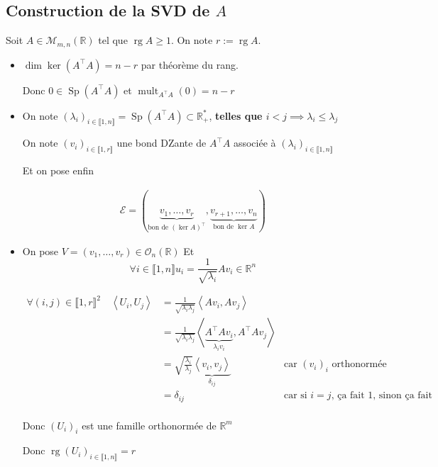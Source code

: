 \documentclass{article}
\newcommand{\mult}{\operatorname{mult}}
\newcommand{\Sp}{\operatorname{Sp}}
\newcommand{\rg}{\operatorname{rg}}
\newcommand{\dim}{\operatorname{dim}}
\newcommand{\cM}{\mathcal{M}}
\newcommand{\cO}{\mathcal{O}}
\newcommand{\cE}{\mathcal{E}}
\newcommand{\R}{\mathbb{R}}
\begin{document}
\subsection{Construction de la SVD de $A$}

Soit $A \in \cM_{m,n}(\R)$ tel que $\rg A \ge 1$. On note $r := \rg A$.

\begin{itemize}
	\item $\dim \ker (A^\top A) = n - r$ par théorème du rang. 

		Donc $0 \in \Sp(A^\top A)$ et $\mult_{A^\top A}(0) = n -r$
	\item On note $(\lambda_i)_{i\in \llbracket 1, n \rrbracket} = \Sp(A^\top A) \subset \R_+^\ast$, {\bf telles que $i < j \implies \lambda_i \le  \lambda_j$}

		On note $(v_i)_{i\in \llbracket 1, r\rrbracket}$ une bond DZante de $A^\top A$ associée à $(\lambda_i)_{i\in \llbracket 1, n \rrbracket}$

		Et on pose enfin

		\begin{align*}
		\cE = \left(\underbrace{v_1, \ldots, v_r}_{\text{bon de $(\ker A)^\top$}}, \underbrace{v_{r+1}, \ldots, v_n}_{\text{bon de $\ker A$}} \right)
		\end{align*}


		\item 
		On pose $V = (v_1, \ldots, v_r) \in \cO_n(\R)$
		Et \[
			\forall i\in \llbracket 1, n\rrbracket u_i = \frac{1}{\sqrt{\lambda_i} } A v_i \in \R^n 
		\] 

		\begin{align*}
			\forall (i, j) \in \llbracket 1, r \rrbracket^2\quad \left<U_i, U_j \right> &= \frac{1}{\sqrt{\lambda_i \lambda_j} } \left<Av_i, Av_j \right> \\
												    &= \frac{1}{\sqrt{\lambda_i \lambda_j} } \left<\underbrace{A^\top A v_i}_{\lambda_i v_i}, A^\top Av_j \right> \\
												    &= \sqrt{\frac{\lambda_i}{\lambda_j}} \underbrace{\left<v_i, v_j \right>}_{\delta_{ij}} \quad&\text{car $(v_i)_i$ orthonormée} \\
												    &= \delta_{ij} \quad&\text{car si $i=j$, ça fait 1, sinon ça fait 0} \\
		\end{align*}

		Donc $(U_i)_i$ est une famille orthonormée de $\R^m$
	
		Donc $\rg (U_i)_{i\in \llbracket 1, n \rrbracket} = r$


\end{itemize}
\end{document}
